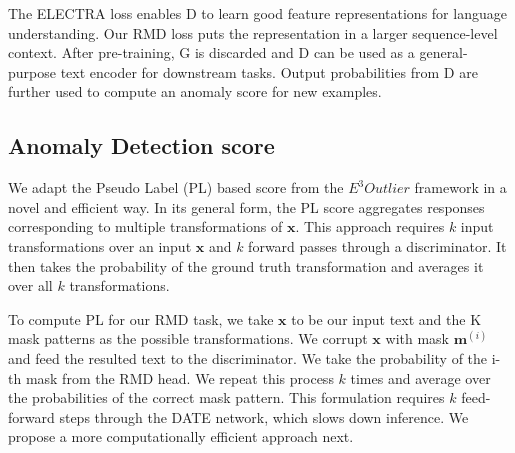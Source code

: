 \documentclass[11pt]{article}
\newcommand{\bx}{\bm{x}}
\begin{document}
The ELECTRA loss enables D to learn good feature representations for language understanding. Our RMD loss puts the representation in a larger sequence-level context. After pre-training, G is discarded and D can be used as a general-purpose text encoder for downstream tasks. Output probabilities from D are further used to compute an anomaly score for new examples.

\subsection{Anomaly Detection score}
\label{sec:pl_score}
We adapt the Pseudo Label (PL) based score from the \emph{$E^{3}Outlier$} framework \cite{neurips2019} in a novel and efficient way. In its general form, the PL score aggregates responses corresponding to multiple transformations of $\bx$. This approach requires $k$ input transformations over an input $\bx$ and $k$ forward passes through a discriminator. It then takes the probability of the ground truth transformation and averages it over all $k$ transformations. 

To compute PL for our RMD task, we take $\bx$ to be our input text and the K mask patterns as the possible transformations. We corrupt $\bx$ with mask $\bm{m}^{(i)}$ and feed the resulted text to the discriminator. We take the probability of the i-th mask from the RMD head. We repeat this process $k$ times and average over the probabilities of the correct mask pattern. This formulation requires $k$ feed-forward steps through the DATE network, which slows down inference. We propose a more computationally efficient approach next.
\end{document}
